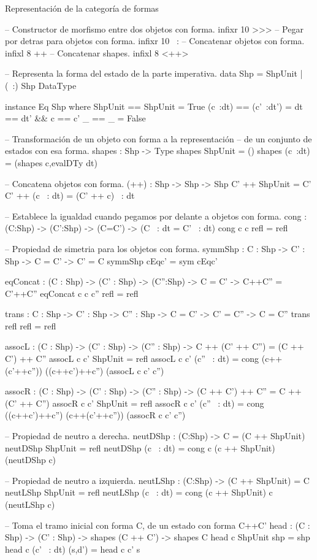 \noindent Representaci\'on de la categor\'ia de formas
\begin{code}
-- Constructor de morfismo entre dos objetos con forma.
infixr 10 >>>
-- Pegar por detras para objetos con forma.
infixr 10 ~:
-- Concatenar objetos con forma.
infixl 8 ++
-- Concatenar shapes.
infixl 8 <++>

-- Representa la forma del estado de la parte imperativa.
data Shp = ShpUnit | (~:) Shp DataType

instance Eq Shp where
    ShpUnit == ShpUnit = True
    (c~:dt) == (c'~:dt') = dt == dt' && c == c'
    _ == _ = False

-- Transformación de un objeto con forma a la representación
-- de un conjunto de estados con esa forma.
shapes : Shp -> Type
shapes ShpUnit = ()
shapes (c~:dt) = (shapes c,evalDTy dt)

-- Concatena objetos con forma.
(++) : Shp -> Shp -> Shp
C' ++ ShpUnit = C'
C' ++ (c ~: dt) = (C' ++ c) ~: dt

-- Establece la igualdad cuando pegamos por delante a objetos con forma.
cong : (C:Shp) -> (C':Shp) -> (C=C') -> (C ~: dt = C' ~: dt)
cong c c refl = refl

-- Propiedad de simetria para los objetos con forma.
symmShp : {C : Shp} -> {C' : Shp} -> C = C' -> C' = C
symmShp cEqc' = sym cEqc'

eqConcat : (C : Shp) -> (C' : Shp) -> (C'':Shp) -> C = C' -> C++C'' = C'++C''
eqConcat c c c'' refl = refl

trans : {C : Shp} -> {C' : Shp} -> {C'' : Shp} -> C = C' -> C' = C'' -> C = C''
trans refl refl = refl

assocL : (C : Shp) -> (C' : Shp) -> (C'' : Shp) -> C ++ (C' ++ C'') = (C ++ C') ++ C''
assocL c c' ShpUnit = refl
assocL c c' (c'' ~: dt) = cong (c++(c'++c'')) ((c++c')++c'') (assocL c c' c'')

assocR : (C : Shp) -> (C' : Shp) -> (C'' : Shp) -> (C ++ C') ++ C'' = C ++ (C' ++ C'')
assocR c c' ShpUnit = refl
assocR c c' (c'' ~: dt) = cong ((c++c')++c'') (c++(c'++c'')) (assocR c c' c'')

-- Propiedad de neutro a derecha.
neutDShp : (C:Shp) -> C = (C ++ ShpUnit)
neutDShp ShpUnit = refl
neutDShp (c ~: dt) = cong c (c ++ ShpUnit) (neutDShp c)

-- Propiedad de neutro a izquierda.
neutLShp : (C:Shp) -> (C ++ ShpUnit) = C
neutLShp ShpUnit = refl
neutLShp (c ~: dt) = cong (c ++ ShpUnit) c (neutLShp c)

-- Toma el tramo inicial con forma C, de un estado con forma C++C'
head : (C : Shp) -> (C' : Shp) -> shapes (C ++ C') -> shapes C
head c ShpUnit shp = shp
head c (c' ~: dt) (s,d') = head c c' s


\end{code}
